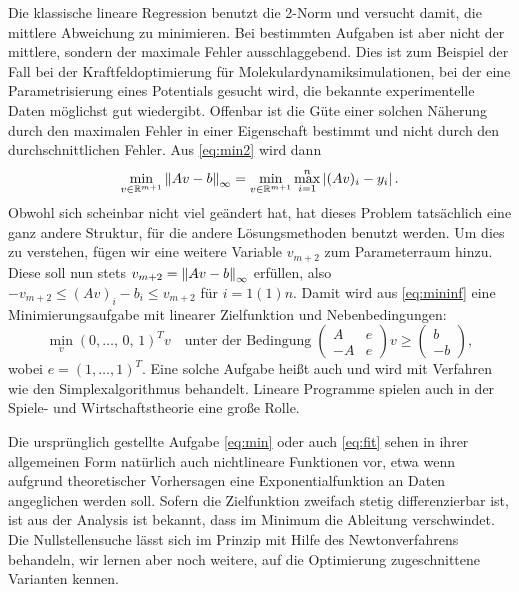 Die klassische lineare Regression benutzt die 2-Norm und versucht
damit, die mittlere Abweichung zu minimieren. Bei bestimmten Aufgaben
ist aber nicht der mittlere, sondern der maximale Fehler
ausschlaggebend. Dies ist zum Beispiel der Fall bei der
Kraftfeldoptimierung für Molekulardynamiksimulationen, bei der eine
Parametrisierung eines Potentials gesucht wird, die bekannte
experimentelle Daten möglichst gut wiedergibt. Offenbar ist die Güte
einer solchen Näherung durch den maximalen Fehler in einer Eigenschaft
bestimmt und nicht durch den durchschnittlichen Fehler.  Aus
\eqref{eq:min2} wird dann
\begin{equation}
  \label{eq:mininf}
  \min_{v\in\mathbb{R}^{m+1}} \left\lVert{A v -
    b}\right\rVert_\infty = \min_{v\in\mathbb{R}^{m+1}} \max_{i=1}^n \left\lvert{(A v)_i - y_i}\right\rvert.
\end{equation}
Obwohl sich scheinbar nicht viel geändert hat, hat dieses Problem
tatsächlich eine ganz andere Struktur, für die andere Lösungsmethoden
benutzt werden. Um dies zu verstehen, fügen wir eine weitere Variable
$v_{m+2}$ zum Parameterraum hinzu. Diese soll nun stets $v_{m+2} =
\left\lVert{A v - b}\right\rVert_\infty$ erfüllen, also $-v_{m+2}\le (A v)_i - b_i \le
v_{m+2}$ für $i=1(1)n$. Damit wird aus \eqref{eq:mininf} eine
Minimierungsaufgabe mit linearer Zielfunktion und Nebenbedingungen:
\begin{equation}
  \label{eq:chebyshevappr}
  \min_v (0,\ldots,\,0,\,1)^T v\quad\text{unter der Bedingung}\;
  \begin{pmatrix}
    A  & e\\
    -A & e
  \end{pmatrix} v \ge
  \begin{pmatrix}
    b\\
    -b
  \end{pmatrix},
\end{equation}
wobei $e=(1,\ldots,1)^T$. Eine solche Aufgabe heißt auch
\emph{} und wird mit Verfahren wie den
Simplexalgorithmus behandelt. Lineare Programme spielen auch in der
Spiele- und Wirtschaftstheorie eine große Rolle.

Die ursprünglich gestellte Aufgabe \eqref{eq:min} oder auch
\eqref{eq:fit} sehen in ihrer allgemeinen Form natürlich auch
nichtlineare Funktionen vor, etwa wenn aufgrund theoretischer
Vorhersagen eine Exponentialfunktion an Daten angeglichen werden soll.
Sofern die Zielfunktion zweifach stetig differenzierbar ist, ist aus
der Analysis ist bekannt, dass im Minimum die Ableitung
verschwindet. Die Nullstellensuche lässt sich im Prinzip mit Hilfe des
Newtonverfahrens behandeln, wir lernen aber noch weitere, auf die
Optimierung zugeschnittene Varianten kennen.

